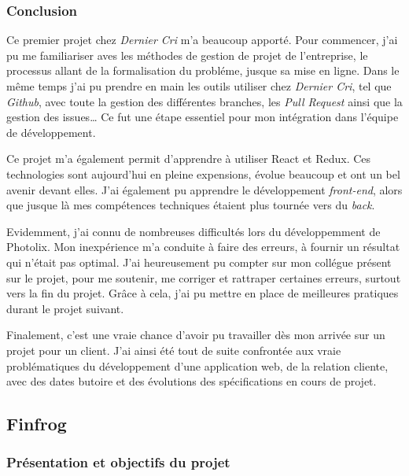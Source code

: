 \bigskip

\subsubsection{Conclusion}\label{conclusion}

\bigskip

Ce premier projet chez \emph{Dernier Cri} m'a beaucoup apporté. Pour
commencer, j'ai pu me familiariser aves les méthodes de gestion de
projet de l'entreprise, le processus allant de la formalisation du
probléme, jusque sa mise en ligne. Dans le même temps j'ai pu prendre en
main les outils utiliser chez \emph{Dernier Cri}, tel que \emph{Github},
avec toute la gestion des différentes branches, les \emph{Pull Request}
ainsi que la gestion des issues\ldots{} Ce fut une étape essentiel pour
mon intégration dans l'équipe de développement.

\bigskip

Ce projet m'a également permit d'apprendre à utiliser React et Redux.
Ces technologies sont aujourd'hui en pleine expensions, évolue beaucoup
et ont un bel avenir devant elles. J'ai également pu apprendre le
développement \emph{front-end}, alors que jusque là mes compétences
techniques étaient plus tournée vers du \emph{back}.

\bigskip

Evidemment, j'ai connu de nombreuses difficultés lors du développemment
de Photolix. Mon inexpérience m'a conduite à faire des erreurs, à
fournir un résultat qui n'était pas optimal. J'ai heureusement pu
compter sur mon collégue présent sur le projet, pour me soutenir, me
corriger et rattraper certaines erreurs, surtout vers la fin du projet.
Grâce à cela, j'ai pu mettre en place de meilleures pratiques durant le
projet suivant.

\bigskip

Finalement, c'est une vraie chance d'avoir pu travailler dès mon arrivée
sur un projet pour un client. J'ai ainsi été tout de suite confrontée
aux vraie problématiques du développement d'une application web, de la
relation cliente, avec des dates butoire et des évolutions des
spécifications en cours de projet.

\subsection{Finfrog}\label{finfrog}

\subsubsection{Présentation et objectifs du
projet}\label{pruxe9sentation-et-objectifs-du-projet-1}

